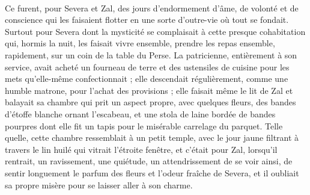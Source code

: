 \documentclass[a4paper, 11pt, oneside, polutonikogreek, french]{article}
\begin{document}
\paragraph{}
Ce furent, pour Severa et Zal, des jours d'endormement d'âme, de volonté et de conscience qui les faisaient flotter en une sorte d'outre-vie où tout se fondait. Surtout pour Severa dont la mysticité se complaisait à cette presque cohabitation qui, hormis la nuit, les faisait vivre ensemble, prendre les repas ensemble, rapidement, sur un coin de la table du Perse. La patricienne, entièrement à son service, avait acheté un fourneau de terre et des ustensiles de cuisine pour les mets qu'elle-même confectionnait ; elle descendait régulièrement, comme une humble matrone, pour l'achat des provisions ; elle faisait même le lit de Zal et balayait sa chambre qui prit un aspect propre, avec quelques fleurs, des bandes d'étoffe blanche ornant l'escabeau, et une stola de laine bordée de bandes pourpres dont elle fit un tapis pour le misérable carrelage du parquet. Telle quelle, cette chambre ressemblait à un petit temple, avec le jour jaune filtrant à travers le lin huilé qui vitrait l'étroite fenêtre, et c'était pour Zal, lorsqu'il rentrait, un ravissement, une quiétude, un attendrissement de se voir ainsi, de sentir longuement le parfum des fleurs et l'odeur fraîche de Severa, et il oubliait sa propre misère pour se laisser aller à son charme.
\end{document}
